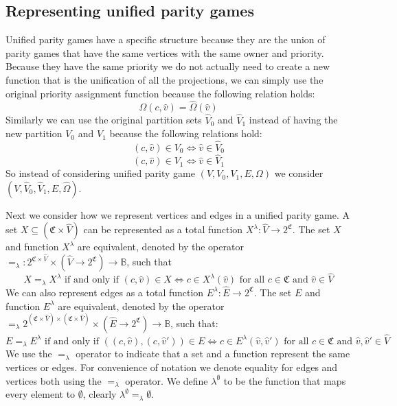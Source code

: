 \subsection{Representing unified parity games}
Unified parity games have a specific structure because they are the union of parity games that have the same vertices with the same owner and priority. Because they have the same priority we do not actually need to create a new function that is the unification of all the projections, we can simply use the original priority assignment function because the following relation holds:
\[ \Omega(c,\hat{v}) = \hat{\Omega}(\hat{v}) \]
Similarly we can use the original partition sets $\hat{V}_0$ and $\hat{V}_1$ instead of having the new partition $V_0$ and $V_1$ because the following relations hold:
\[ (c,\hat{v}) \in V_0 \iff \hat{v}\in \hat{V}_0 \]
\[ (c,\hat{v}) \in V_1 \iff \hat{v}\in \hat{V}_1 \]
So instead of considering unified parity game $(V,V_0,V_1,E,\Omega)$ we consider $(V,\hat{V}_0,\hat{V}_1,E,\hat{\Omega})$. 

Next we consider how we represent vertices and edges in a unified parity game. A set $X \subseteq (\mathfrak{C} \times \hat{V})$ can be represented as a total function $X^\lambda : \hat{V} \rightarrow 2^\mathfrak{C}$. The set $X$ and function $X^\lambda$ are equivalent, denoted by the operator $=_\lambda: 2^{\mathfrak{C} \times \hat{V}} \times (\hat{V} \rightarrow 2^\mathfrak{C}) \rightarrow \mathbb{B}$, such that
\[ X =_\lambda X^\lambda \text{ if and only if } (c,\hat{v}) \in X \iff c \in X^\lambda(\hat{v})\text{ for all }c \in \mathfrak{C}\text{ and }\hat{v} \in \hat{V} \]
We can also represent edges as a total function $E^\lambda : \hat{E} \rightarrow 2^\mathfrak{C}$. The set $E$ and function $E^\lambda$ are equivalent, denoted by the operator $=_\lambda 2^{(\mathfrak{C} \times \hat{V}) \times(\mathfrak{C} \times \hat{V})} \times (\hat{E} \rightarrow 2^\mathfrak{C}) \rightarrow \mathbb{B}$, such that:
\[ E =_\lambda E^\lambda \text{ if and only if } ((c,\hat{v}),(c,\hat{v}')) \in E \iff c \in E^\lambda(\hat{v},\hat{v}')\text{ for all }c \in \mathfrak{C}\text{ and }\hat{v},\hat{v}' \in \hat{V} \]
We use the $=_\lambda$ operator to indicate that a set and a function represent the same vertices or edges. For convenience of notation we denote equality for edges and vertices both using the $=_\lambda$ operator. We define $\lambda^\emptyset$ to be the function that maps every element to $\emptyset$, clearly $\lambda^\emptyset =_\lambda \emptyset$. 


